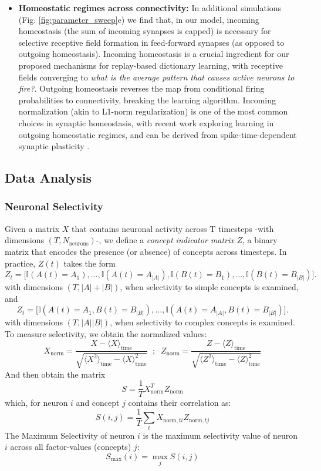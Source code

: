 \documentclass{article}
\begin{document}
\begin{itemize}
    \item \textbf{Homeostatic regimes across connectivity: }In additional simulations (Fig. \ref{fig:parameter_sweep}e) we find that, in our model, incoming homeostasis (the sum of incoming synapses is capped) is necessary for selective receptive field formation in feed-forward synapses (as opposed to outgoing homeostasis). Incoming homeostasis is a crucial ingredient for our proposed mechanisms for replay-based dictionary learning, with receptive fields converging to \textit{what is the average pattern that causes active neurons to fire?}. Outgoing homeostasis reverses the map from conditional firing probabilities to connectivity, breaking the learning algorithm. Incoming normalization (akin to L1-norm regularization) is one of the most common choices in synaptic homeostasis, with recent work exploring learning in outgoing homeostatic regimes, and can be derived from spike-time-dependent synaptic plasticity .
\end{itemize}
\clearpage
\subsection*{Data Analysis}
\subsubsection*{Neuronal Selectivity}
Given a matrix $X$ that contains neuronal activity across T timesteps -with dimensions $(T, N_\textrm{neurons})$-, we define a \textit{concept indicator matrix} $Z$, a binary matrix that encodes the presence (or absence) of concepts across timesteps. In practice, $Z(t)$ takes the form
\[
Z_t
=
\big[
\mathbb{I}(A(t)=A_1),\ldots,\mathbb{I}(A(t)=A_{|A|}),
\mathbb{I}(B(t)=B_1),\ldots,\mathbb{I}(B(t)=B_{|B|})
\big].
\]
with dimensions  $(T, |A| + |B|)$, when selectivity to simple concepts is examined, and 
\[
Z_t
=
\big[
\mathbb{I}(A(t)=A_1, B(t)=B_{|B|}),\ldots, \mathbb{I}(A(t)=A_{|A|}, B(t)=B_{|B|})
\big].
\]
with dimensions  $(T, |A||B|)$, when selectivity to complex concepts is examined. To measure selectivity, we obtain the normalized values:
\begin{equation}
    X_\textrm{norm} = \frac{X - \langle X \rangle_{\textrm{time}}}{\sqrt{\langle X^2 \rangle_\textrm{time} - \langle X \rangle_\textrm{time}^2}} \;\; ; \;\; Z_\textrm{norm} = \frac{Z - \langle Z \rangle_{\textrm{time}}}{\sqrt{\langle Z^2 \rangle_\textrm{time} - \langle Z \rangle_\textrm{time}^2}}
\end{equation} 
And then obtain the matrix 
\begin{equation}
    S = \frac{1}{T}X_\textrm{norm}^TZ_\textrm{norm}
\end{equation}
which, for neuron $i$ and concept $j$ contains their correlation as:
\begin{equation}
    S(i, j) = \frac{1}{T}\sum_t X_{\textrm{norm}, ti}Z_{\textrm{norm}, tj}
\end{equation}
The Maximum Selectivity of neuron $i$ is the maximum selectivity value of neuron $i$ across all factor-values (concepts) $j$:
\begin{equation}
    S_\textrm{max}(i) = \max_{j}{S(i, j)}
\end{equation}
\end{document}
